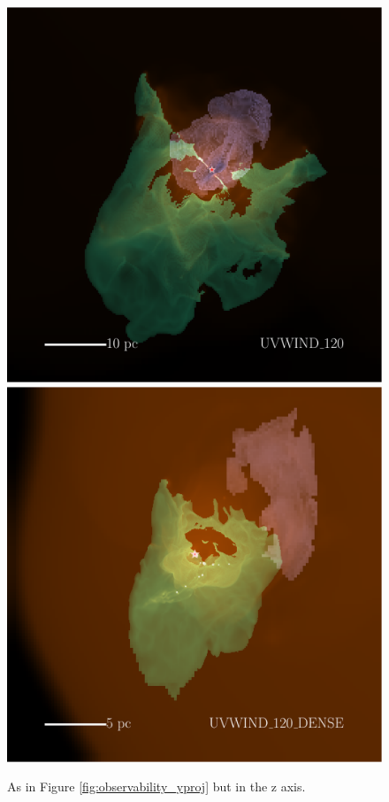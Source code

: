 \documentclass[a4paper,fleqn,usenatbib]{mnras}
\begin{document}
\begin{figure}
	\includegraphics[width=1\columnwidth]{plots/fig13c.pdf} \includegraphics[width=1\columnwidth]{plots/fig13d.pdf}
	\caption{As in Figure \ref{fig:observability_yproj} but in the z axis.}
	\label{fig:observability_zproj}
\end{figure}



\bsp	%
\label{lastpage}
\end{document}
